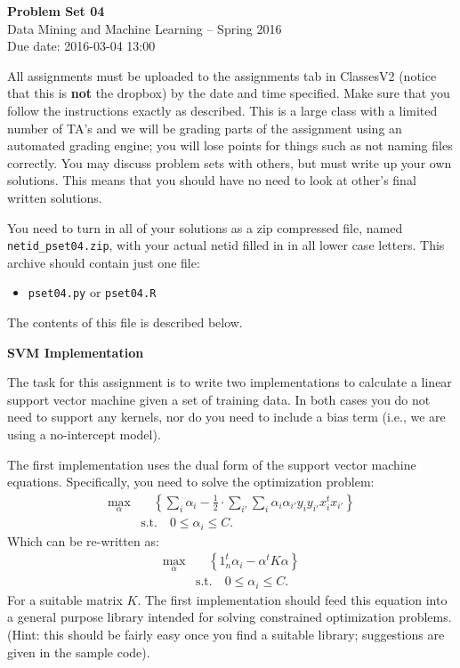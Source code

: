 \documentclass[12pt]{article}
\begin{document}
\begin{center}
{\bf Problem Set 04} \\
Data Mining and Machine Learning -- Spring 2016 \\
Due date: 2016-03-04 13:00
\end{center}

\medskip

All assignments must be uploaded to the assignments tab in ClassesV2
(notice that this is \textbf{not} the dropbox) by the date and time specified.
Make sure that you follow the instructions exactly as described.
This is a large class with a limited number of TA's and we will be
grading parts of the assignment using an automated grading engine;
you will lose points for things such as not naming files correctly.
You may discuss problem sets with others, but must write up your own
solutions. This means that you should have no need to look at other's
final written solutions.

You need to turn in all of your solutions as a zip compressed file, named
\texttt{netid\_pset04.zip}, with your actual netid filled in in all lower
case letters. This archive should contain just one file:
\begin{itemize}
\item \texttt{pset04.py} or \texttt{pset04.R}
\end{itemize}
The contents of this file is described below.

\medskip

\textbf{SVM Implementation}

The task for this assignment is to write two implementations to calculate
a linear support vector machine given a set of training data. In both cases
you do not need to support any kernels, nor do you need to include a bias
term (i.e., we are using a no-intercept model).

The first implementation uses the dual form of the support vector machine
equations. Specifically, you need to solve the optimization problem:
\begin{align*}
\max_\alpha& \quad \left\{ \sum_i \alpha_i - \frac{1}{2} \cdot \sum_{i'} \sum_i \alpha_i \alpha_{i'} y_i y_{i'}
x_i^t x_{i'} \right\} \\
&\text{s.t.} \quad 0 \leq \alpha_i \leq C.
\end{align*}
Which can be re-written as:
\begin{align*}
\max_\alpha&  \quad \left\{ 1_n^t \alpha_i - \alpha^t K \alpha \right\} \\
&\text{s.t.} \quad 0 \leq \alpha_i \leq C.
\end{align*}
For a suitable matrix $K$. The first implementation should feed this equation
into a general purpose library intended for solving constrained optimization
problems. (Hint: this should be fairly easy once you find a suitable
library; suggestions are given in the sample code).
\end{document}

